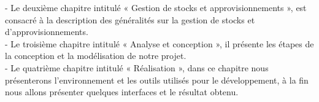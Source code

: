 - Le deuxième chapitre intitulé « Gestion de stocks et approvisionnements », est consacré à la description des généralités sur la gestion de stocks et d’approvisionnements.\\

- Le troisième chapitre intitulé « Analyse et conception », il présente les étapes de la conception et la modélisation de notre projet.\\

- Le quatrième chapitre intitulé « Réalisation », dans ce chapitre nous présenterons l’environnement et les outils utilisés pour le développement, à la fin nous allons présenter quelques interfaces et le résultat obtenu.\\





